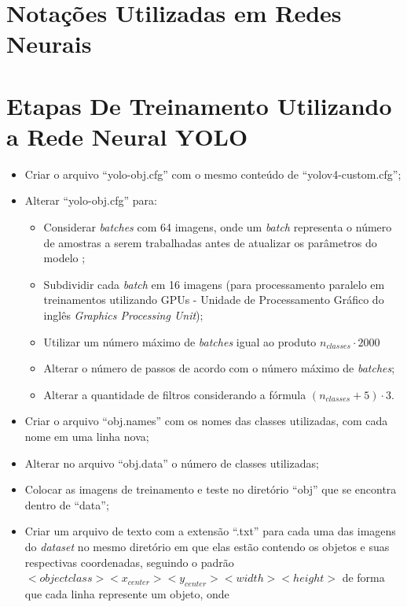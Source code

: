 \chapter{Notações Utilizadas em Redes Neurais} \label{apendice:notacao}


\chapter{Etapas De Treinamento Utilizando a Rede Neural YOLO } \label{apendice:etapas-yolo}
\begin{itemize}
  \item Criar o arquivo ``yolo-obj.cfg'' com o mesmo conteúdo de ``yolov4-custom.cfg'';
  \item Alterar ``yolo-obj.cfg'' para:
  \begin{itemize}
    \item Considerar \textit{batches} com 64 imagens, onde um \textit{batch} representa o número de amostras a serem trabalhadas antes de atualizar os parâmetros do modelo \cite{ref:Brownlee};
    \item Subdividir cada \textit{batch} em 16 imagens (para processamento paralelo em treinamentos utilizando GPUs - Unidade de Processamento Gráfico do inglês \textit{Graphics Processing Unit});
    \item Utilizar um número máximo de \textit{batches} igual ao produto $n_{classes} \cdot 2000$
    \item Alterar o número de passos de acordo com o número máximo de \textit{batches};
    \item Alterar a quantidade de filtros considerando a fórmula $(n_{classes} + 5) \cdot 3$.
  \end{itemize}
  \item Criar o arquivo ``obj.names'' com os nomes das classes utilizadas, com cada nome em uma linha nova;
  \item Alterar no arquivo ``obj.data'' o número de classes utilizadas;
  \item Colocar as imagens de treinamento e teste no diretório ``obj'' que se encontra dentro de ``data'';
  \item Criar um arquivo de texto com a extensão ``.txt'' para cada uma das imagens do \textit{dataset} no mesmo diretório em que elas estão contendo os objetos e suas respectivas coordenadas, seguindo o padrão  $<objectclass> <x_{center}> <y_{center}> <width> <height>$ de forma que cada linha represente um objeto, onde

\end{itemize}

